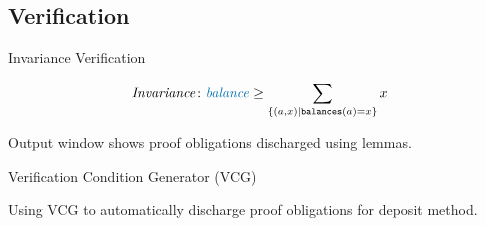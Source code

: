 \documentclass[aspectratio=169]{beamer}
\begin{document}
\subsection{Verification}
\begin{frame}{Invariance Verification}
\begin{Example}{}{}
\begin{align*}
		\mathit{Invariance}\colon&\mathit{\color{blue}balance} \geq \sum_{\{(a,x)|\texttt{balances}(a)=x\}} x\\
	\end{align*}
		\begin{center}\vspace{-2mm}
	\end{center}\vspace{-2mm}
Output window shows proof obligations discharged using lemmas.
\end{Example}
\end{frame}
%
\begin{frame}{Verification Condition Generator (VCG)}
\begin{Example}{}{}
	Using VCG to automatically discharge proof obligations for deposit method.\\
	\end{Example}
\end{frame}
%
\end{document}
